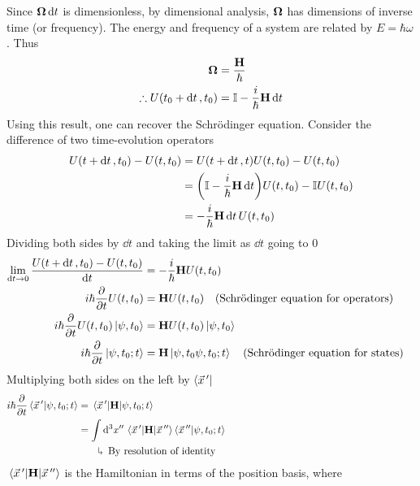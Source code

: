\documentclass[12pt,a4paper,titlepage]{article}
\newcommand{\explain}[1]{%
	\quad\rotatebox[origin=c]{180}{\enskip$\Lsh$}\hfill
	\begin{minipage}[t]{\dimexpr\linewidth-8em\relax}
	#1
	\end{minipage}\hspace{4em}\bigskip
}
\begin{document}
Since $\vb{\Omega}\dd{t}$ is dimensionless, by dimensional analysis, $\vb{\Omega}$ has dimensions of inverse time (or frequency). The energy and frequency of a system are related by $E=\hbar\omega$. Thus
\begin{equation}
\begin{aligned}
\vb{\Omega}&=\frac{\vb{H}}{\hbar}\\
\therefore U(t_{0}+\dd{t},t_{0})&=\mathbb{I}-\frac{i}{\hbar}\vb{H}\dd{t}
\end{aligned}
\end{equation}
Using this result, one can recover the Schr\"{o}dinger equation. Consider the difference of two time-evolution operators
\begin{equation}
\begin{aligned}
U(t+\dd{t},t_{0})-U(t,t_{0})&=U(t+\dd{t},t)U(t,t_{0})-U(t,t_{0})\\
&=\qty(\mathbb{I}-\frac{i}{\hbar}\vb{H}\dd{t})U(t,t_{0})-\mathbb{I}U(t,t_{0})\\
&=-\frac{i}{\hbar}\vb{H}\dd{t}U(t,t_{0})
\end{aligned}
\end{equation}
Dividing both sides by $\dd{t}$ and taking the limit as $\dd{t}$ going to 0
\begin{equation}
\begin{aligned}
\lim_{\dd{t}\rightarrow0}\frac{U(t+\dd{t},t_{0})-U(t,t_{0})}{\dd{t}}&=-\frac{i}{\hbar}\vb{H}U(t,t_{0})\\
i\hbar\pdv{t}U(t,t_{0})&=\vb{H}U(t,t_{0})\qq{(Schr\"{o}dinger equation for operators)}\\
i\hbar\pdv{t}U(t,t_{0})\ket{\psi,t_{0}}&=\vb{H}U(t,t_{0})\ket{\psi,t_{0}}\\
i\hbar\pdv{t}\ket{\psi,t_{0};t}&=\vb{H}\ket{\psi,t_{0}\psi,t_{0};t}\qq{(Schr\"{o}dinger equation for states)}
\end{aligned}
\end{equation}
Multiplying both sides on the left by $\bra{\vec{x}\,'}$
\begin{equation}
\begin{aligned}
i\hbar\pdv{t}\ip{\vec{x}\,'}{\psi,t_{0};t}&=\mel{\vec{x}\,'}{\vb{H}}{\psi,t_{0};t}\\
&=\int\dd[3]{x''}\mel{\vec{x}\,'}{\vb{H}}{\vec{x}\,''}\ip{\vec{x}\,''}{\psi,t_{0};t}\\
&\quad\explain{By resolution of identity}
\end{aligned}
\end{equation}
$\mel{\vec{x}\,'}{\vb{H}}{\vec{x}\,''}$ is the Hamiltonian in terms of the position basis, where
\end{document}
